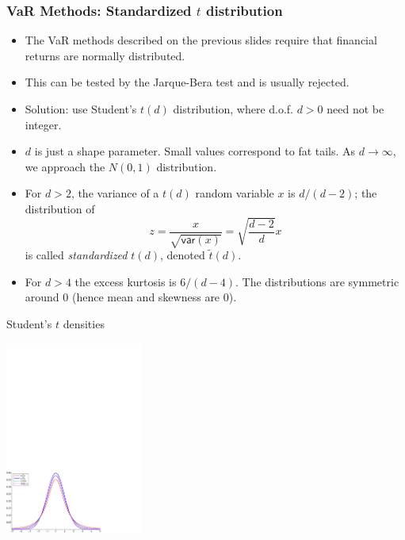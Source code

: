 \begin{frame}%

\frametitle{VaR Methods: Standardized $t$ distribution}

\begin{itemize}
\item The VaR methods described on the previous slides require that
financial returns are normally distributed.

\item This can be tested by the Jarque-Bera test and is usually rejected.
\item Solution: use Student's $t(d)$ distribution, where d.o.f. $d>0$ need not be integer.

\item $d$ is just a shape parameter. Small values correspond to fat tails. As $d\rightarrow \infty $, we approach the $N(0,1)$ distribution.
\item For $d>2$, the variance of a $t(d)$ random variable $x$ is $d/(d-2)$;
the distribution of
\begin{equation*}
z=\frac{x}{\sqrt{\mathsf{var}(x)}}=\sqrt{\frac{d-2}{d}}x
\end{equation*}
is called \emph{\color{red}standardized }$t(d)$, denoted $\tilde{t}(d)$.

\item For $d>4$ the excess kurtosis is $6/(d-4)$. The distributions are
symmetric around $0$ (hence mean and skewness are $0$).
\end{itemize}

\end{frame}%

\begin{frame}%

\begin{block}{Student's $t$ densities}
\centerline{\includegraphics[height=2.5in]{Student}}
\end{block}

\end{frame}%

